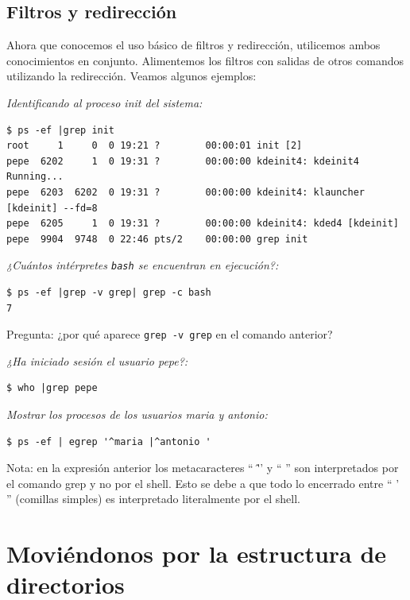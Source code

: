 \documentclass[12pt]{article}
\begin{document}
\subsection*{Filtros y redirección}
Ahora que conocemos el uso básico de filtros y redirección, utilicemos ambos 
conocimientos en conjunto. Alimentemos los filtros con salidas de otros comandos
utilizando la redirección. Veamos algunos ejemplos: 

\textit{Identificando al proceso init del sistema:  }

\begin{verbatim}
$ ps -ef |grep init 
root     1     0  0 19:21 ?        00:00:01 init [2]  
pepe  6202     1  0 19:31 ?        00:00:00 kdeinit4: kdeinit4 Running...
pepe  6203  6202  0 19:31 ?        00:00:00 kdeinit4: klauncher [kdeinit] --fd=8
pepe  6205     1  0 19:31 ?        00:00:00 kdeinit4: kded4 [kdeinit]  
pepe  9904  9748  0 22:46 pts/2    00:00:00 grep init
\end{verbatim}

\textit{¿Cuántos intérpretes \texttt{bash} se encuentran en ejecución?:}
\begin{verbatim}
$ ps -ef |grep -v grep| grep -c bash 
7
\end{verbatim}
Pregunta: ¿por qué aparece \texttt{grep -v grep} en el comando anterior?

\textit{¿Ha iniciado sesión el usuario pepe?:}
\begin{verbatim}
$ who |grep pepe
\end{verbatim}

\textit{Mostrar los procesos de los usuarios maria y antonio:}
\begin{verbatim}
$ ps -ef | egrep '^maria |^antonio '
\end{verbatim}

Nota: en la expresión anterior los metacaracteres `` \^ '' y `` \textbar '' son 
interpretados por el comando grep y no por el shell. Esto se debe a que 
todo lo encerrado entre `` ' '' (comillas simples) es interpretado 
literalmente por el shell.



\section{Moviéndonos por la estructura de directorios}
\end{document}
